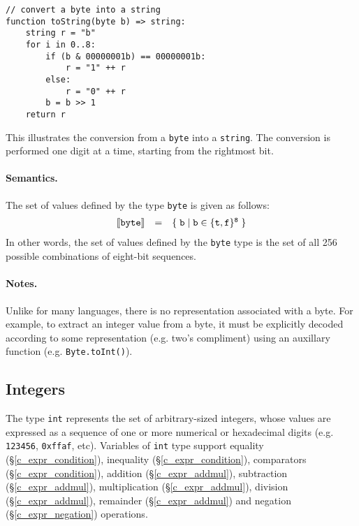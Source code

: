 \begin{lstlisting}
// convert a byte into a string
function toString(byte b) => string:
    string r = "b"
    for i in 0..8:
        if (b & 00000001b) == 00000001b:
            r = "1" ++ r
        else:
            r = "0" ++ r
        b = b >> 1	
    return r
\end{lstlisting}
This illustrates the conversion from a \lstinline{byte} into a \lstinline{string}.  The conversion is performed one digit at a time, starting from the rightmost bit.

\paragraph{Semantics.}  The set of values defined by the type \lstinline{byte} is given as follows:
\begin{displaymath}
\begin{array}{rcl}
{\tt\llbracket byte\rrbracket} & = & {\tt\{\;b\;|\;b\in\{t,f\}^8\;\}}\\
\end{array}
\end{displaymath}
In other words, the set of values defined by the \lstinline{byte} type is the set of all 256 possible combinations of eight-bit sequences.

\paragraph{Notes.}  Unlike for many languages, there is no representation associated with a byte. For example, to extract an integer value from a byte, it must be explicitly decoded according to some representation (e.g. two's compliment) using an auxillary function (e.g. \lstinline{Byte.toInt()}).



\subsection{Integers}
\label{c_types_int}

The type \lstinline{int} represents the set of arbitrary-sized integers, whose values are expressed as a sequence of one or more numerical or hexadecimal digits (e.g. \lstinline{123456}, \lstinline{0xffaf}, etc).  Variables of \lstinline{int} type support equality (\S\ref{c_expr_condition}), inequality (\S\ref{c_expr_condition}), comparators (\S\ref{c_expr_condition}), addition (\S\ref{c_expr_addmul}), subtraction (\S\ref{c_expr_addmul}), multiplication (\S\ref{c_expr_addmul}), division (\S\ref{c_expr_addmul}), remainder (\S\ref{c_expr_addmul}) and negation (\S\ref{c_expr_negation}) operations.


